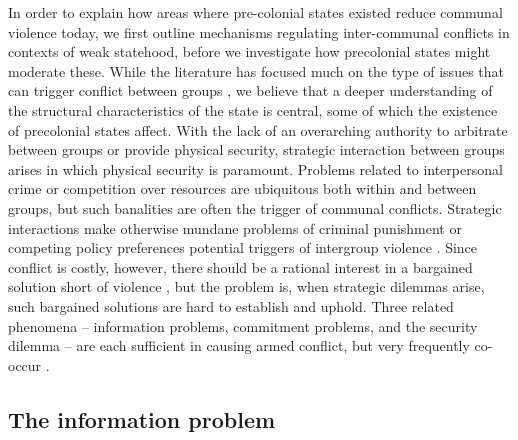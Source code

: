 \documentclass[12pt]{article}
\begin{document}
In order to explain how areas where pre-colonial states existed reduce communal
violence today, we first outline mechanisms regulating inter-communal conflicts
in contexts of weak statehood, before we investigate how precolonial states
might moderate these. While the literature has focused much on the type of
issues that can trigger conflict between groups \citep{Doring2020, Eck2014,
Elfversson2015, Fjelde2014, Fjelde2012, Hillesund_2017, Theisen2012}, we believe
that a deeper understanding of the structural characteristics of the state is
central, some of which the existence of precolonial states affect. With the lack
of an overarching authority to arbitrate between groups or provide physical
security, strategic interaction between groups arises in which physical security
is paramount. Problems related to interpersonal crime or competition over
resources are ubiquitous both within and between groups, but such banalities are
often the trigger of communal conflicts. Strategic interactions make otherwise
mundane problems of criminal punishment or competing policy preferences
potential triggers of intergroup violence \citep{diamond2013world, Eaton_2008,
Fearon1995, Fearon_1996, Lake_1996}. Since conflict is costly, however, there
should be a rational interest in a bargained solution short of violence
\citep{Fearon1995}, but the problem is, when strategic dilemmas arise, such
bargained solutions are hard to establish and uphold. Three related phenomena –
information problems, commitment problems, and the security dilemma – are each
sufficient in causing armed conflict, but very frequently co-occur
\citep[46]{Lake_1996}.

\subsection{The information problem}
\end{document}
